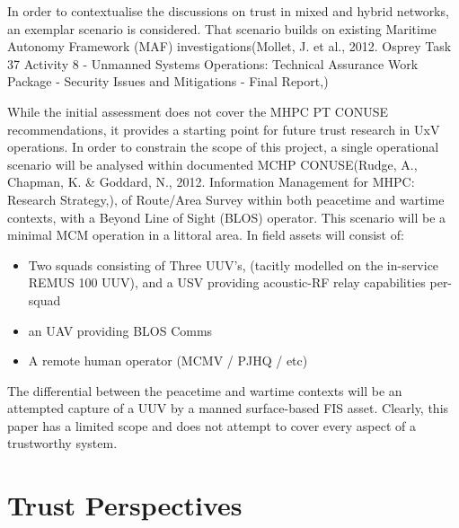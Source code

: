In order to contextualise the discussions on trust in mixed and hybrid networks, an exemplar scenario is considered.
That scenario builds on existing Maritime Autonomy Framework (MAF) investigations(Mollet, J. et al., 2012. Osprey Task 37 Activity 8 - Unmanned Systems Operations: Technical Assurance Work Package - Security Issues and Mitigations - Final Report,)

While the initial assessment does not cover the MHPC PT CONUSE recommendations, it provides a starting point for future trust research in UxV operations.
In order to constrain the scope of this project, a single operational scenario will be analysed within documented MCHP CONUSE(Rudge, A., Chapman, K. \& Goddard, N., 2012. Information Management for MHPC: Research Strategy,), of Route/Area Survey within both peacetime and wartime contexts, with a Beyond Line of Sight (BLOS) operator.
This scenario will be a minimal MCM operation in a littoral area.
In field assets will consist of:
\begin{itemize}
	\item Two squads consisting of Three UUV’s, (tacitly modelled on the in-service REMUS 100 UUV), and a USV providing acoustic-RF relay capabilities per-squad
	\item	an UAV providing BLOS Comms
	\item	A remote human operator (MCMV / PJHQ / etc)
\end{itemize}


The differential between the peacetime and wartime contexts will be an attempted capture of a UUV by a manned surface-based FIS asset.
Clearly, this paper has a limited scope and does not attempt to cover every aspect of a trustworthy system.

\section{Trust Perspectives}

